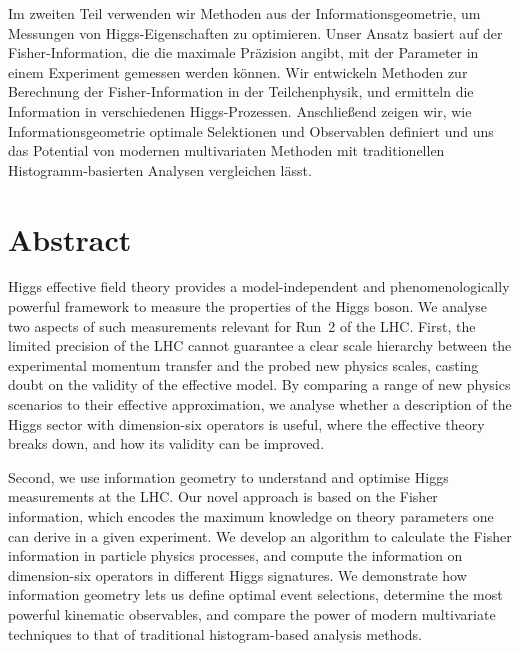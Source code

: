 Im zweiten Teil verwenden wir Methoden aus der Informationsgeometrie,
um Messungen von Higgs-Eigenschaften zu optimieren. Unser Ansatz
basiert auf der Fisher-Information, die die maximale Pr\"azision
angibt, mit der Parameter in einem Experiment gemessen werden
k\"onnen. Wir entwickeln Methoden zur Berechnung der
Fisher-Information in der Teilchenphysik, und ermitteln die
Information in verschiedenen Higgs-Prozessen. Anschlie\ss{}end zeigen
wir, wie Informationsgeometrie optimale Selektionen und Observablen
definiert und uns das Potential von modernen multivariaten Methoden
mit traditionellen Histogramm-basierten Analysen vergleichen l\"asst.




\chapter*{Abstract}


Higgs effective field theory provides a model-independent and
phenomenologically powerful framework to measure the properties of the
Higgs boson. We analyse two aspects of such measurements relevant for
Run~2 of the LHC. First, the limited precision of the LHC cannot
guarantee a clear scale hierarchy between the experimental momentum
transfer and the probed new physics scales, casting doubt on the
validity of the effective model. By comparing a range of new physics
scenarios to their effective approximation, we analyse whether a
description of the Higgs sector with dimension-six operators is
useful, where the effective theory breaks down, and how its validity
can be improved.

Second, we use information geometry to understand and optimise Higgs
measurements at the LHC. Our novel approach is based on the Fisher
information, which encodes the maximum knowledge on theory parameters
one can derive in a given experiment. We develop an algorithm to
calculate the Fisher information in particle physics processes, and
compute the information on dimension-six operators in different Higgs
signatures.  We demonstrate how information geometry lets us define
optimal event selections, determine the most powerful kinematic
observables, and compare the power of modern multivariate techniques
to that of traditional histogram-based analysis methods.
